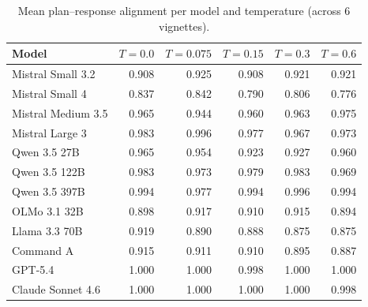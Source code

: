\begin{table}[H]
  \centering\small
  \begin{tabular}{lrrrrr}
    \toprule
    Model & $T{=}0.0$ & $T{=}0.075$ & $T{=}0.15$ & $T{=}0.3$ & $T{=}0.6$ \\
    \midrule
    Mistral Small 3.2 & 0.908 & 0.925 & 0.908 & 0.921 & 0.921 \\
    Mistral Small 4 & 0.837 & 0.842 & 0.790 & 0.806 & 0.776 \\
    Mistral Medium 3.5 & 0.965 & 0.944 & 0.960 & 0.963 & 0.975 \\
    Mistral Large 3 & 0.983 & 0.996 & 0.977 & 0.967 & 0.973 \\
    Qwen 3.5 27B & 0.965 & 0.954 & 0.923 & 0.927 & 0.960 \\
    Qwen 3.5 122B & 0.983 & 0.973 & 0.979 & 0.983 & 0.969 \\
    Qwen 3.5 397B & 0.994 & 0.977 & 0.994 & 0.996 & 0.994 \\
    OLMo 3.1 32B & 0.898 & 0.917 & 0.910 & 0.915 & 0.894 \\
    Llama 3.3 70B & 0.919 & 0.890 & 0.888 & 0.875 & 0.875 \\
    Command A & 0.915 & 0.911 & 0.910 & 0.895 & 0.887 \\
    GPT-5.4 & 1.000 & 1.000 & 0.998 & 1.000 & 1.000 \\
    Claude Sonnet 4.6 & 1.000 & 1.000 & 1.000 & 1.000 & 0.998 \\
    \bottomrule
  \end{tabular}
  \caption{Mean plan--response alignment per model and temperature (across 6 vignettes).}
\end{table}
